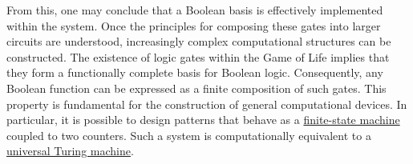 From this, one may conclude that a Boolean basis is effectively implemented within the system.
Once the principles for composing these gates into larger circuits are understood, increasingly complex computational structures can be constructed.
The existence of logic gates within the Game of Life implies that they form a functionally complete basis for Boolean logic.
Consequently, any Boolean function can be expressed as a finite composition of such gates. This property is fundamental for the construction of general
 computational devices. In particular, it is possible to design patterns that behave as a
 \href{https://en.wikipedia.org/wiki/Finite-state_machine}{finite-state machine} coupled to two counters.
Such a system is computationally equivalent to a
\href{https://en.wikipedia.org/wiki/Universal_Turing_machine}{universal Turing machine}.

